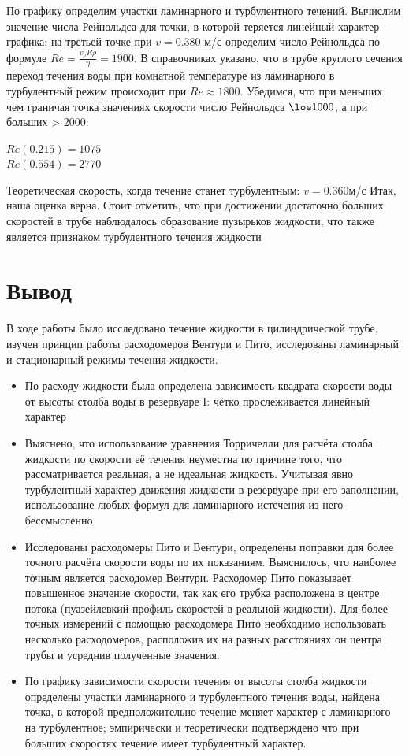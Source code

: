 \documentclass{article}
\begin{document}
\begin{enumerate}
По графику определим участки ламинарного и турбулентного течений. Вычислим значение числа Рейнольдса для точки, в которой теряется линейный характер графика: на третьей точке при $v = 0.380$ м/с определим число Рейнольдса по формуле $Re = \frac{v_pR\rho}{\eta} = 1900$. В справочниках указано, что в трубе круглого сечения переход течения воды при комнатной температуре из ламинарного в турбулентный режим происходит при $Re \approx 1800$.
Убедимся, что при меньших чем граничая точка значениях скорости число Рейнольдса $\loe 1000$, а при больших > 2000:\\
\begin{center}
$Re(0.215) = 1075$\\
$Re(0.554) = 2770$\\
\end{center}
Теоретическая скорость, когда течение станет турбулентным: $v = 0.360$м/с
Итак, наша оценка верна. Стоит отметить, что при достижении достаточно больших скоростей в трубе наблюдалось образование пузырьков жидкости, что также является признаком турбулентного течения жидкости

\end{enumerate}

\section{Вывод}

В ходе работы было исследовано течение жидкости в цилиндрической трубе, изучен принцип работы расходомеров Вентури и Пито, исследованы ламинарный и стационарный режимы течения жидкости. 
\begin{itemize}
  \item По расходу жидкости была определена зависимость квадрата скорости воды от высоты столба воды в резервуаре I: чётко прослеживается линейный характер
  \item Выяснено, что использование уравнения Торричелли для расчёта столба жидкости по скорости её течения неуместна по причине того, что рассматривается реальная, а не идеальная жидкость. Учитывая явно турбулентный характер движения жидкости в резервуаре при его заполнении, использование любых формул для ламинарного истечения из него бессмысленно
  \item Исследованы расходомеры Пито и Вентури, определены поправки для более точного расчёта скорости воды по их показаниям. Выяснилось, что наиболее точным является расходомер Вентури. Расходомер Пито показывает повышенное значение скорости, так как его трубка расположена в центре потока (пуазейлевкий профиль скоростей в реальной жидкости). Для более точных измерений с помощью расходомера Пито необходимо использовать несколько расходомеров, расположив их на разных расстояниях он центра трубы и усреднив полученные значения.
  \item По графику зависимости скорости течения от высоты столба жидкости определены участки ламинарного и турбулентного течения воды, найдена точка, в которой предположительно течение меняет характер с ламинарного на турбулентное; эмпирически и теоретически подтверждено что при больших скоростях течение имеет турбулентный характер.
\end{itemize}
\end{document}
